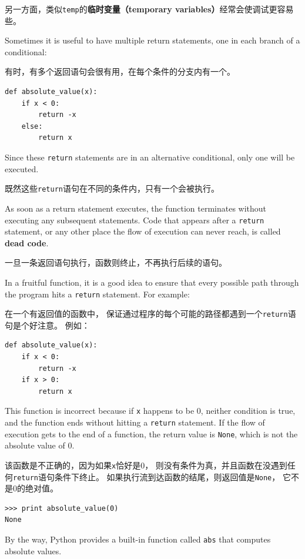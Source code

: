 \documentclass[10pt]{book}
\begin{document}
\begin{CJK}{UTF8}{gbsn}
另一方面，类似{\tt temp}的{\bf 临时变量（temporary variables）}经常会使调试更容易些。

Sometimes it is useful to have multiple return statements, one in each
branch of a conditional:

有时，有多个返回语句会很有用，在每个条件的分支内有一个。

\begin{verbatim}
def absolute_value(x):
    if x < 0:
        return -x
    else:
        return x
\end{verbatim}
%
Since these {\tt return} statements are in an alternative conditional,
only one will be executed.

既然这些{\tt return}语句在不同的条件内，只有一个会被执行。

As soon as a return statement executes, the function
terminates without executing any subsequent statements.
Code that appears after a {\tt return} statement, or any other place
the flow of execution can never reach, is called {\bf dead code}.

一旦一条返回语句执行，函数则终止，不再执行后续的语句。

In a fruitful function, it is a good idea to ensure
that every possible path through the program hits a
{\tt return} statement.  For example:

在一个有返回值的函数中，
保证通过程序的每个可能的路径都遇到一个{\tt return}语句是个好注意。
例如：

\begin{verbatim}
def absolute_value(x):
    if x < 0:
        return -x
    if x > 0:
        return x
\end{verbatim}
%
This function is incorrect because if {\tt x} happens to be 0,
neither condition is true, and the function ends without hitting a
{\tt return} statement.  If the flow of execution gets to the end
of a function, the return value is {\tt None}, which is not
the absolute value of 0.

该函数是不正确的，因为如果{\tt x}恰好是0，
则没有条件为真，并且函数在没遇到任何{\tt return}语句条件下终止。
如果执行流到达函数的结尾，则返回值是{\tt None}，
它不是0的绝对值。

\begin{verbatim}
>>> print absolute_value(0)
None
\end{verbatim}
%
By the way, Python provides a built-in function called 
{\tt abs} that computes absolute values.


\end{CJK}
\end{document}
